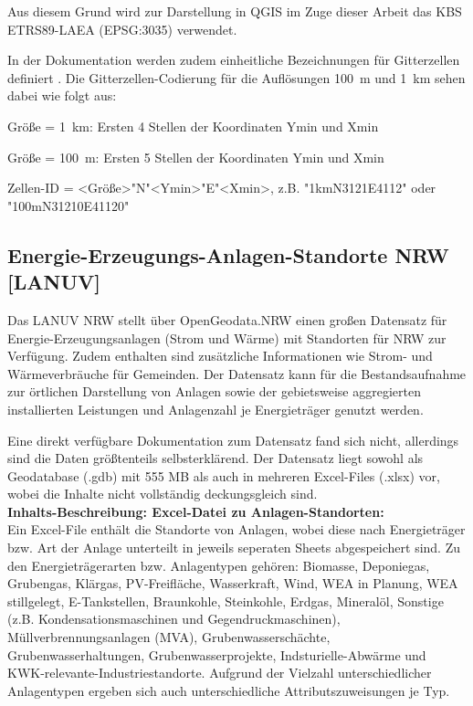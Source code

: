 			Aus diesem Grund wird zur Darstellung in QGIS im Zuge dieser Arbeit das KBS ETRS89-LAEA (EPSG:3035) verwendet. 
			
			In der Dokumentation werden zudem einheitliche Bezeichnungen für Gitterzellen definiert \cite{web_inspire_bkg_gittersysteme}. Die Gitterzellen-Codierung für die Auflösungen 100~m und 1~km sehen dabei wie folgt aus: 
			
			Größe = 1~km: Ersten 4 Stellen der Koordinaten Ymin und Xmin
			
			Größe = 100~m: Ersten 5 Stellen der Koordinaten Ymin und Xmin
			
			Zellen-ID = <Größe>"N"<Ymin>"E"<Xmin>, z.B. "1kmN3121E4112" oder "100mN31210E41120"
		
		\subsection{Energie-Erzeugungs-Anlagen-Standorte NRW [LANUV]}
			Das LANUV NRW stellt über OpenGeodata.NRW einen großen Datensatz für Energie-Erzeugungsanlagen (Strom und Wärme) mit Standorten für NRW zur Verfügung. Zudem enthalten sind zusätzliche Informationen wie Strom- und Wärmeverbräuche für Gemeinden. Der Datensatz kann für die Bestandsaufnahme zur örtlichen Darstellung von Anlagen sowie der gebietsweise aggregierten installierten Leistungen und Anlagenzahl je Energieträger genutzt werden. \cite{web_download_opengeodata_nrw}
			
			Eine direkt verfügbare Dokumentation zum Datensatz fand sich nicht, allerdings sind die Daten größtenteils selbsterklärend. Der Datensatz liegt sowohl als Geodatabase (.gdb) mit 555 MB als auch in mehreren Excel-Files (.xlsx) vor, wobei die Inhalte nicht vollständig deckungsgleich sind. \\
			
			\textbf{Inhalts-Beschreibung: Excel-Datei zu Anlagen-Standorten:}\\
			Ein Excel-File enthält die Standorte von Anlagen, wobei diese nach Energieträger bzw. Art der Anlage unterteilt in jeweils seperaten Sheets abgespeichert sind. Zu den Energieträgerarten bzw. Anlagentypen gehören: Biomasse, Deponiegas, Grubengas, Klärgas, PV-Freifläche, Wasserkraft, Wind, WEA in Planung, WEA stillgelegt, E-Tankstellen, Braunkohle, Steinkohle, Erdgas, Mineralöl, Sonstige (z.B. Kondensationsmaschinen und Gegendruckmaschinen), Müllverbrennungsanlagen (MVA), Grubenwasserschächte, Grubenwasserhaltungen, Grubenwasserprojekte, Indsturielle-Abwärme und KWK-relevante-Industriestandorte. Aufgrund der Vielzahl unterschiedlicher Anlagentypen ergeben sich auch unterschiedliche Attributszuweisungen je Typ.
			
